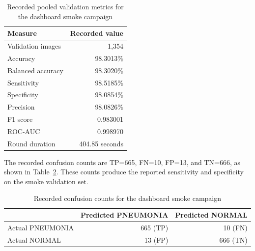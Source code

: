 \documentclass[12pt,a4paper]{report}
\begin{document}
\begin{table}[htbp]
\centering
\caption{Recorded pooled validation metrics for the dashboard smoke campaign}
\label{tab:smoke-results}
\begin{tabular}{lr}
\toprule
\textbf{Measure} & \textbf{Recorded value} \\
\midrule
Validation images & 1,354 \\
Accuracy & 98.3013\% \\
Balanced accuracy & 98.3020\% \\
Sensitivity & 98.5185\% \\
Specificity & 98.0854\% \\
Precision & 98.0826\% \\
F1 score & 0.983001 \\
ROC-AUC & 0.998970 \\
Round duration & 404.85 seconds \\
\bottomrule
\end{tabular}
\end{table}

The recorded confusion counts are TP=665, FN=10, FP=13, and TN=666, as shown in Table~\ref{tab:confusion}. These counts produce the reported sensitivity and specificity on the smoke validation set.

\begin{table}[htbp]
\centering
\caption{Recorded confusion counts for the dashboard smoke campaign}
\label{tab:confusion}
\begin{tabular}{lrr}
\toprule
 & \textbf{Predicted PNEUMONIA} & \textbf{Predicted NORMAL} \\
\midrule
Actual PNEUMONIA & 665 (TP) & 10 (FN) \\
Actual NORMAL & 13 (FP) & 666 (TN) \\
\bottomrule
\end{tabular}
\end{table}
\end{document}
